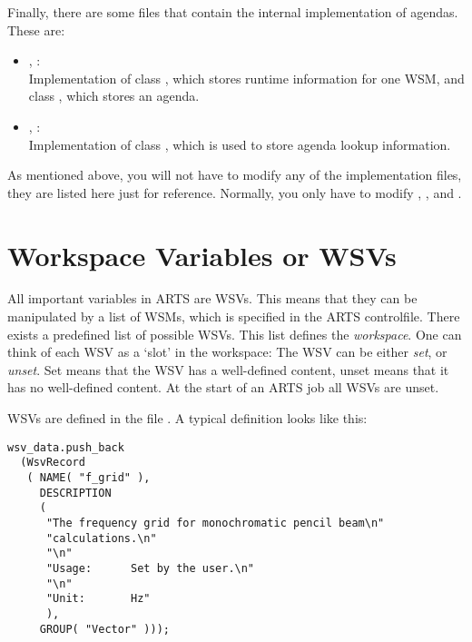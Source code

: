 Finally, there are some files that contain the internal implementation
of agendas. These are:
\begin{itemize}
\item {}, :\\
  Implementation of class , which stores runtime
  information for one WSM, and class , which stores
  an agenda.
\item {}, :\\
  Implementation of class , which is used to store
  agenda lookup information.
\end{itemize}
  

\vspace{2ex} As mentioned above, you will not have to modify any of
the implementation files, they are listed here just for reference.
Normally, you only have to modify ,
, and .

\section{Workspace Variables or WSVs}
\label{sec:agendas:wsvs}

All important variables in ARTS are WSVs. This means that they can be
manipulated by a list of WSMs, which is specified in the ARTS
controlfile. There exists a predefined list of possible WSVs. This
list defines the \emph{workspace}. One can think of each WSV as a
`slot' in the workspace: The WSV can be either \emph{set}, or
\emph{unset}. Set means that the WSV has a well-defined content, unset
means that it has no well-defined content. At the start of an ARTS job
all WSVs are unset.

WSVs are defined in the file . A typical
definition looks like this:

{\small
\begin{verbatim}
wsv_data.push_back
  (WsvRecord
   ( NAME( "f_grid" ),
     DESCRIPTION
     (
      "The frequency grid for monochromatic pencil beam\n"
      "calculations.\n"
      "\n"
      "Usage:      Set by the user.\n"
      "\n"
      "Unit:       Hz"
      ),
     GROUP( "Vector" )));
\end{verbatim}
}

